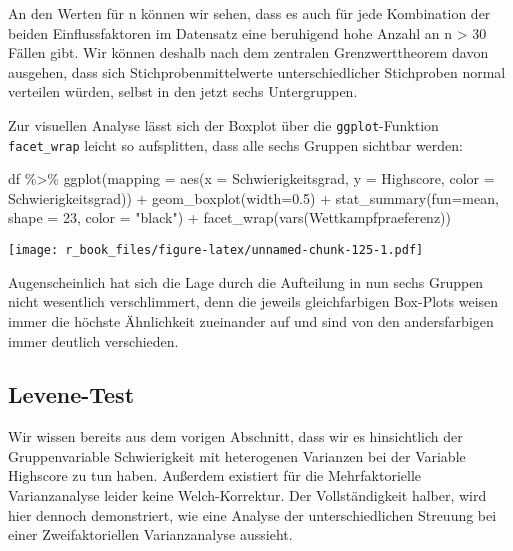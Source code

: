 \documentclass[
]{book}
\newenvironment{Shaded}{\begin{snugshade}}{\end{snugshade}}
\newcommand{\AttributeTok}[1]{\textcolor[rgb]{0.77,0.63,0.00}{#1}}
\newcommand{\DecValTok}[1]{\textcolor[rgb]{0.00,0.00,0.81}{#1}}
\newcommand{\FloatTok}[1]{\textcolor[rgb]{0.00,0.00,0.81}{#1}}
\newcommand{\FunctionTok}[1]{\textcolor[rgb]{0.00,0.00,0.00}{#1}}
\newcommand{\NormalTok}[1]{#1}
\newcommand{\SpecialCharTok}[1]{\textcolor[rgb]{0.00,0.00,0.00}{#1}}
\newcommand{\StringTok}[1]{\textcolor[rgb]{0.31,0.60,0.02}{#1}}
\begin{document}
An den Werten für n können wir sehen, dass es auch für jede Kombination der beiden Einflussfaktoren im Datensatz eine beruhigend hohe Anzahl an n \textgreater{} 30 Fällen gibt. Wir können deshalb nach dem zentralen Grenzwerttheorem davon ausgehen, dass sich Stichprobenmittelwerte unterschiedlicher Stichproben normal verteilen würden, selbst in den jetzt sechs Untergruppen.

Zur visuellen Analyse lässt sich der Boxplot über die \texttt{ggplot}-Funktion \texttt{facet\_wrap} leicht so aufsplitten, dass alle sechs Gruppen sichtbar werden:

\begin{Shaded}
\begin{Highlighting}[]
\NormalTok{df }\SpecialCharTok{\%\textgreater{}\%} 
  \FunctionTok{ggplot}\NormalTok{(}\AttributeTok{mapping =} \FunctionTok{aes}\NormalTok{(}\AttributeTok{x =}\NormalTok{ Schwierigkeitsgrad, }\AttributeTok{y =}\NormalTok{ Highscore, }\AttributeTok{color =}\NormalTok{ Schwierigkeitsgrad)) }\SpecialCharTok{+}
  \FunctionTok{geom\_boxplot}\NormalTok{(}\AttributeTok{width=}\FloatTok{0.5}\NormalTok{) }\SpecialCharTok{+}
  \FunctionTok{stat\_summary}\NormalTok{(}\AttributeTok{fun=}\NormalTok{mean, }\AttributeTok{shape =} \DecValTok{23}\NormalTok{, }\AttributeTok{color =} \StringTok{"black"}\NormalTok{) }\SpecialCharTok{+}
  \FunctionTok{facet\_wrap}\NormalTok{(}\FunctionTok{vars}\NormalTok{(Wettkampfpraeferenz))}
\end{Highlighting}
\end{Shaded}

\texttt{[image: r\_book\_files/figure-latex/unnamed-chunk-125-1.pdf]}

Augenscheinlich hat sich die Lage durch die Aufteilung in nun sechs Gruppen nicht wesentlich verschlimmert, denn die jeweils gleichfarbigen Box-Plots weisen immer die höchste Ähnlichkeit zueinander auf und sind von den andersfarbigen immer deutlich verschieden.

\hypertarget{levene-test-1}{%
\subsection{Levene-Test}\label{levene-test-1}}

Wir wissen bereits aus dem vorigen Abschnitt, dass wir es hinsichtlich der Gruppenvariable Schwierigkeit mit heterogenen Varianzen bei der Variable Highscore zu tun haben. Außerdem existiert für die Mehrfaktorielle Varianzanalyse leider keine Welch-Korrektur. Der Vollständigkeit halber, wird hier dennoch demonstriert, wie eine Analyse der unterschiedlichen Streuung bei einer Zweifaktoriellen Varianzanalyse aussieht.
\end{document}
